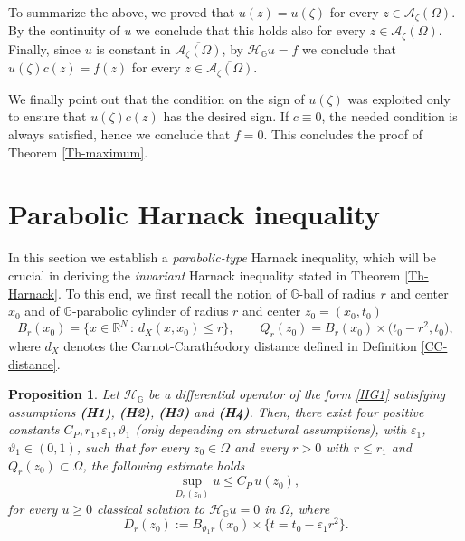\documentclass[11pt,a4paper]{article}
\newtheorem{proposition}[theorem]{\bf Proposition}
\numberwithin{equation}{section}
\newcommand{\R}{\mathbb{R}}
\def \A {\mathscr{A}}
\def \GG {{\mathbb{G}}}
\def \H {\mathscr{H}_\GG}
\def \e {{\varepsilon}}
\def \z {{\zeta}}
\def \O {{\Omega}}
\begin{document}
{{To summarize the above, we proved that  $u(z)=u(\z)$ for every $z\in\A_\z(\O)$. By the continuity of $u$ we conclude that this holds also for every $z\in \overline{\A_\z(\O)}$. Finally, since $u$ is constant in $\overline{\A_\z(\O)}$, by $\H u=f$ we conclude that $u(\z)c(z)= f(z)$ for every $z\in \overline{\A_\z(\O)}$.


\medskip
We finally point out that the condition on the sign of $u(\z)$ was exploited only to ensure that $u(\z)c(z)$ has the desired sign. If $c\equiv 0$, the needed condition is always satisfied, hence we conclude that $f=0$. This concludes the proof of Theorem \ref{Th-maximum}.







\section{Parabolic Harnack inequality}\label{Parabolic Harnack inequality}
In this section we establish a \emph{parabolic-type} Harnack inequality, which will be crucial in deriving the \emph{invariant} Harnack inequality stated in Theorem \ref{Th-Harnack}. To this end, we first recall the notion of $\GG$-ball of  radius $r$ and center $x_0$ and of $\GG$-parabolic cylinder of  radius $r$ and center $z_0=(x_0,t_0)$
\begin{equation}\label{x-ball}
	B_r(x_0)=\Big\{ x \in \R^N \, : \, d_{X}(x,x_0) \leq r \Big\},\qquad 	Q_r(z_0)=B_r(x_0)\times \Big(t_0-r^2,t_0\Big),
\end{equation}
where $d_X$ denotes the Carnot-Carathéodory distance defined in Definition \ref{CC-distance}.
\begin{proposition}\label{Parabolic-Harnack}
	Let $\H$ be a differential operator of the form \eqref{HG1} satisfying assumptions \textbf{(H1)}, \textbf{(H2)}, \textbf{(H3)} and \textbf{(H4)}. Then, there exist four positive constants $C_P,r_1,\e_1,\vartheta_1$ (only depending on structural assumptions), with $\e_1$, $\vartheta_1 \in (0,1)$, such that for every $z_0\in\O$ and every $r>0$ with $r\leq r_1$ and ${Q}_{r}(z_0)\subset \O$, the following estimate holds
	\begin{equation}\label{harnack}
		\sup_{D_r(z_0)} u \leq C_P \, u(z_0),
	\end{equation}
	for every $u\geq0$ classical solution to $\H u =0$ in $\O$, where
	\begin{equation}\label{eq:def-D_r}
		D_r(z_0):=B_{\vartheta_1r}(x_0)\times \Big\{t= t_0 - \e_1 r^2\Big\}.
	\end{equation}	
\end{proposition}
\begin{figure}\label{figure-harnack-sets}
	\centering
	

\end{figure}}}
\end{document}
